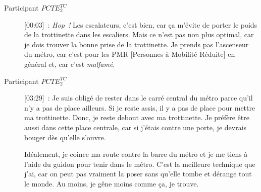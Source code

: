 \begin{description}
    \item[Participant \(PCTE^{TC}_{2}\)] [00:03]~: \textsl{Hop~!} Les escalateurs, c'est bien, car ça m'évite de porter le poids de la trottinette dans les escaliers. Mais ce n'est pas non plus optimal, car je dois trouver la bonne prise de la trottinette. Je prends pas l'ascenseur du métro, car c'est pour les PMR [Personnes à Mobilité Réduite] en général et, car c'est \textsl{malfamé}.
    \item[Participant \(PCTE^{TC}_{2}\)] [03:29]~: Je suis obligé de rester dans le carré central du métro parce qu'il n'y a pas de place ailleurs. Si je reste assis, il y a pas de place pour mettre ma trottinette. Donc, je reste debout avec ma trottinette. Je préfère être aussi dans cette place centrale, car si j'étais contre une porte, je devrais bouger dès qu'elle s'ouvre.%
    
    Idéalement, je coince ma route contre la barre du métro et je me tiens à l'aide du guidon pour tenir dans le métro. C'est la meilleure technique que j'ai, car on peut pas vraiment la poser sans qu'elle tombe et dérange tout le monde. Au moins, je gêne moins comme ça, je trouve.%


\end{description}
